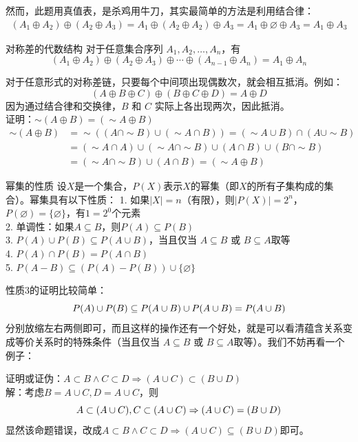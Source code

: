\documentclass[lang=cn,11pt]{elegantbook}
\begin{document}
然而，此题用真值表，是杀鸡用牛刀，其实最简单的方法是利用结合律：
\begin{align*}
(A_1 \oplus A_2) \oplus (A_2 \oplus A_3) = A_1 \oplus (A_2 \oplus A_2) \oplus A_3 = A_1 \oplus \varnothing \oplus A_3  = A_1 \oplus A_3 
\end{align*}
\begin{theorem}{对称差的代数结构}
    对于任意集合序列 $A_1, A_2, \ldots, A_n$，有\vspace{-10pt}
$$(A_1 \oplus A_2) \oplus (A_2 \oplus A_3) \oplus \cdots \oplus (A_{n-1} \oplus A_n) = A_1 \oplus A_n$$
\end{theorem}
对于任意形式的对称差链，只要每个中间项出现偶数次，就会相互抵消。例如：
$$(A \oplus B \oplus C) \oplus (B \oplus C \oplus D) = A \oplus D$$
因为通过结合律和交换律，$B$ 和 $C$ 实际上各出现两次，因此抵消。\\
证明：$\sim(A \oplus B) = (\sim A \oplus B)$
\begin{align*}
      \sim(A \oplus B) &= \sim((A\cap \sim B) \cup (\sim A \cap B))=(\sim A\cup B)\cap (A\cup \sim B) \\
      &=(\sim A\cap A)\cup(\sim A\cap\sim B)\cup(A\cap B)\cup(B\cap\sim B)\\
      &=(\sim A\cap\sim B)\cup(A\cap B)= (\sim A \oplus B)
\end{align*}
\begin{theorem}{幂集的性质}
设$X$是一个集合，$P(X)$表示$X$的幂集（即$X$的所有子集构成的集合）。幂集具有以下性质：
1. 如果$|X| = n$（有限），则$|P(X)| = 2^n$，$P(\varnothing) = \{\varnothing\}$，有$1 = 2^0$个元素\\
2. 单调性：如果$A \subseteq B$，则$P(A) \subseteq P(B)$\\
3. $P(A) \cup P(B) \subseteq P(A \cup B)$，当且仅当 $A \subseteq B$ 或 $B \subseteq A$取等\\
4. $P(A) \cap P(B) = P(A \cap B)$\\
5. $ P(A - B) \subseteq (P(A) - P(B))\cup\{\varnothing\}$
\end{theorem}
性质3的证明比较简单：\vspace{-10pt}
\[P(A) \cup P(B) \subseteq P(A \cup B)\cup P(A\cup B)=P(A\cup B)\vspace{-10pt}\]
分别放缩左右两侧即可，而且这样的操作还有一个好处，就是可以看清蕴含关系变成等价关系时的特殊条件（当且仅当 $A \subseteq B$ 或 $B \subseteq A$取等）。我们不妨再看一个例子：

证明或证伪：$A\subset B\land C\subset D\Rightarrow (A\cup C)\subset (B\cup D)$\\
解：考虑$B=A\cup C,D=A\cup C$，则
\vspace{-10pt}\[A\subset(A\cup C),C\subset(A\cup C)\Rightarrow (A\cup C)=(B\cup D)\vspace{-10pt}\]显然该命题错误，改成$A\subset B\land C\subset D\Rightarrow (A\cup C)\subseteq (B\cup D)$即可。
\end{document}
